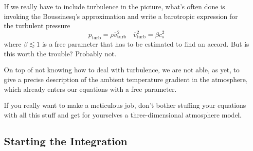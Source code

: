 \par If we really have to include turbulence in the picture, what's often done is invoking the Boussinesq's approximation and write a barotropic expression for the turbulent pressure
\begin{equation*}
    p_{\text{turb}} = \rho\bar{v}_{\text{turb}}^{2} \quad \bar{v}_{\text{turb}}^{2} = \beta c^{2}_{s}
\end{equation*}
where $\beta \lesssim 1$ is a free parameter that has to be estimated to find an accord. But is this worth the trouble? Probably not. 
\par On top of not knowing how to deal with turbulence, we are not able, as yet, to give a precise description of the ambient temperature gradient in the atmosphere, which already enters our equations with a free parameter.
\par If you really want to make a meticulous job, don't bother stuffing your equations with all this stuff and get for yourselves a three-dimensional atmosphere model.

\subsection{Starting the Integration}

